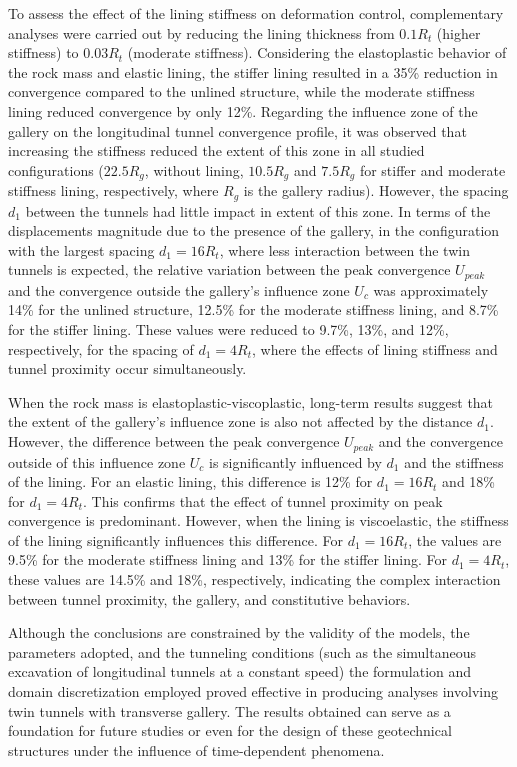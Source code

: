 \documentclass[a4paper,fleqn]{cas-sc}
\begin{document}
To assess the effect of the lining stiffness on deformation control, complementary analyses were carried out by reducing the lining thickness from $0.1R_t$ (higher stiffness) to $0.03R_t$ (moderate stiffness). Considering the elastoplastic behavior of the rock mass and elastic lining, the stiffer lining resulted in a 35\% reduction in convergence compared to the unlined structure, while the moderate stiffness lining reduced convergence by only 12\%. Regarding the influence zone of the gallery on the longitudinal tunnel convergence profile, it was observed that increasing the stiffness reduced the extent of this zone in all studied configurations ($22.5R_g$, without lining, $10.5R_g$ and $7.5R_g$ for stiffer and moderate stiffness lining, respectively, where $R_g$ is the gallery radius). However, the spacing $d_1$ between the tunnels had little impact in extent of this zone. In terms of the displacements magnitude due to the presence of the gallery, in the configuration with the largest spacing $d_1 = 16R_t$, where less interaction between the twin tunnels is expected, the relative variation between the peak convergence $U_{peak}$ and the convergence outside the gallery’s influence zone $U_c$ was approximately 14\% for the unlined structure, 12.5\% for the moderate stiffness lining, and 8.7\% for the stiffer lining. These values were reduced to 9.7\%, 13\%, and 12\%, respectively, for the spacing of $d_1 = 4R_t$, where the effects of lining stiffness and tunnel proximity occur simultaneously.

When the rock mass is elastoplastic-viscoplastic, long-term results suggest that the extent of the gallery's influence zone is also not affected by the distance $d_1$. However, the difference between the peak convergence $U_{peak}$ and the convergence outside of this influence zone $U_c$ is significantly influenced by $d_1$ and the stiffness of the lining. For an elastic lining, this difference is 12\% for $d_1 = 16R_t$ and 18\% for $d_1 = 4R_t$. This confirms that the effect of tunnel proximity on peak convergence is predominant. However, when the lining is viscoelastic, the stiffness of the lining significantly influences this difference. For $d_1 = 16R_t$, the values are 9.5\% for the moderate stiffness lining and 13\% for the stiffer lining. For $d_1 = 4R_t$, these values are 14.5\% and 18\%, respectively, indicating the complex interaction between tunnel proximity, the gallery, and constitutive behaviors.

Although the conclusions are constrained by the validity of the models, the parameters adopted, and the tunneling conditions (such as the simultaneous excavation of longitudinal tunnels at a constant speed) the formulation and domain discretization employed proved effective in producing analyses involving twin tunnels with transverse gallery. The results obtained can serve as a foundation for future studies or even for the design of these geotechnical structures under the influence of time-dependent phenomena.
\end{document}

